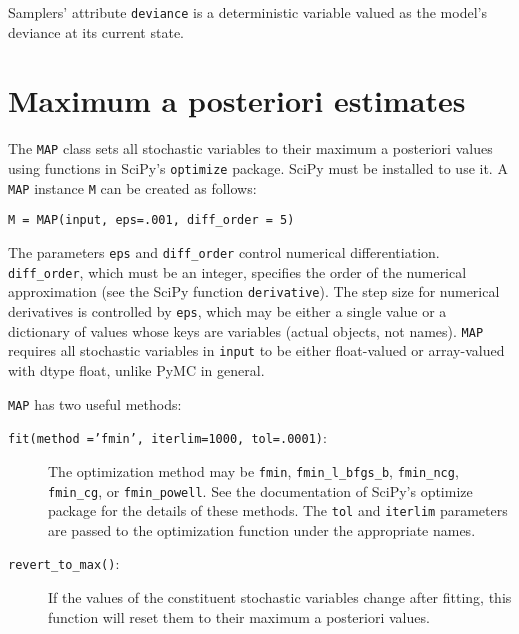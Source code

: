 Samplers' attribute \texttt{deviance} is a deterministic variable valued as the model's deviance at its current state.

\hypertarget{MAP}{}
\section*{Maximum a posteriori estimates} \label{sec:MAP}

The \texttt{MAP} class sets all stochastic variables to their maximum a posteriori values using functions in SciPy's \texttt{optimize} package. SciPy must be installed to use it. A \texttt{MAP} instance \texttt{M} can be created as follows:
\begin{verbatim}
M = MAP(input, eps=.001, diff_order = 5)    
\end{verbatim}
The parameters \texttt{eps} and \texttt{diff_order} control numerical differentiation. \texttt{diff_order}, which must be an integer, specifies the order of the numerical approximation (see the SciPy function \texttt{derivative}). The step size for numerical derivatives is controlled by \texttt{eps}, which may be either a single value or a dictionary of values whose keys are variables (actual objects, not names). \texttt{MAP} requires all stochastic variables in \texttt{input} to be either float-valued or array-valued with dtype float, unlike PyMC in general.

\texttt{MAP} has two useful methods:
\begin{description}
    \item[\texttt{fit(method ='fmin', iterlim=1000, tol=.0001)}:] The optimization method may be \texttt{fmin}, \texttt{fmin_l_bfgs_b}, \texttt{fmin_ncg}, \texttt{fmin_cg}, or \texttt{fmin_powell}. See the documentation of SciPy's optimize package for the details of these methods. The \texttt{tol} and \texttt{iterlim} parameters are passed to the optimization function under the appropriate names.
    \item[\texttt{revert_to_max()}:] If the values of the constituent stochastic variables change after fitting, this function will reset them to their maximum a posteriori values.
\end{description}

